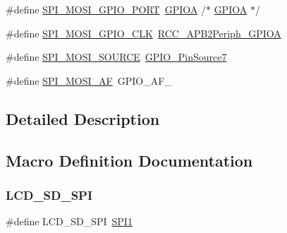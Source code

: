 \begin{DoxyCompactItemize}
\item 
\#define \mbox{\hyperlink{group___s_t_m32_f1_x_x___n_u_c_l_e_o___l_o_w___l_e_v_e_l___s_p_i_ga246babcc2ebf4d22d74c03861f4cca3c}{S\+P\+I\+\_\+\+M\+O\+S\+I\+\_\+\+G\+P\+I\+O\+\_\+\+P\+O\+RT}}~\mbox{\hyperlink{group___peripheral__declaration_gac485358099728ddae050db37924dd6b7}{G\+P\+I\+OA}}                       /$\ast$ \mbox{\hyperlink{group___peripheral__declaration_gac485358099728ddae050db37924dd6b7}{G\+P\+I\+OA}} $\ast$/
\item 
\#define \mbox{\hyperlink{group___s_t_m32_f1_x_x___n_u_c_l_e_o___l_o_w___l_e_v_e_l___s_p_i_ga0f49bb2aa4ba118c68016b00685b1446}{S\+P\+I\+\_\+\+M\+O\+S\+I\+\_\+\+G\+P\+I\+O\+\_\+\+C\+LK}}~\mbox{\hyperlink{group___a_p_b2__peripheral_ga44b92fbf2e288796b1acbce2708f3636}{R\+C\+C\+\_\+\+A\+P\+B2\+Periph\+\_\+\+G\+P\+I\+OA}}
\item 
\#define \mbox{\hyperlink{group___s_t_m32_f1_x_x___n_u_c_l_e_o___l_o_w___l_e_v_e_l___s_p_i_ga3065bf54b403a4db0aea6c47599b2560}{S\+P\+I\+\_\+\+M\+O\+S\+I\+\_\+\+S\+O\+U\+R\+CE}}~\mbox{\hyperlink{group___g_p_i_o___pin__sources_ga609974472a3a7c5274fc56018d7adf16}{G\+P\+I\+O\+\_\+\+Pin\+Source7}}
\item 
\#define \mbox{\hyperlink{group___s_t_m32_f1_x_x___n_u_c_l_e_o___l_o_w___l_e_v_e_l___s_p_i_gacabe53c53fed7efc98fd8a0bb9326d47}{S\+P\+I\+\_\+\+M\+O\+S\+I\+\_\+\+AF}}~G\+P\+I\+O\+\_\+\+A\+F\+\_
\end{DoxyCompactItemize}


\subsection{Detailed Description}


\subsection{Macro Definition Documentation}
\mbox{\label{group___s_t_m32_f1_x_x___n_u_c_l_e_o___l_o_w___l_e_v_e_l___s_p_i_ga323b5431fba170151f0fc83a3c72f352}} 
\subsubsection{\texorpdfstring{LCD\_SD\_SPI}{LCD\_SD\_SPI}}
{\footnotesize\ttfamily \#define L\+C\+D\+\_\+\+S\+D\+\_\+\+S\+PI~\mbox{\hyperlink{group___peripheral__declaration_gad483be344a28ac800be8f03654a9612f}{S\+P\+I1}}}



